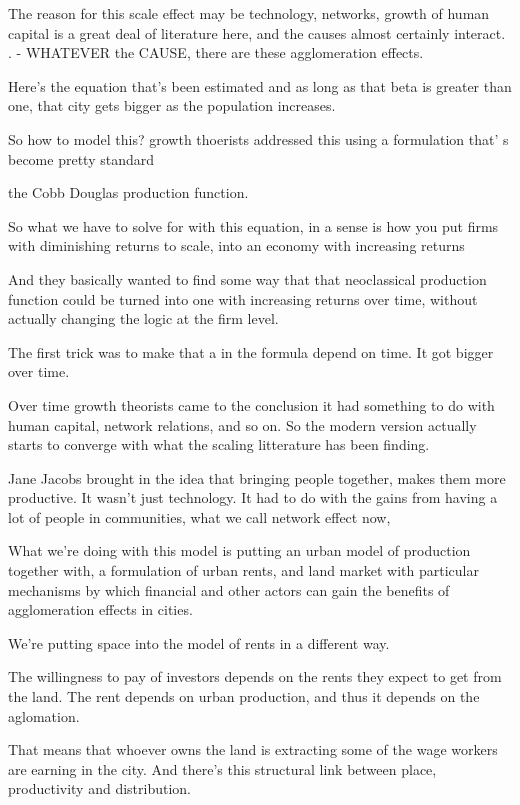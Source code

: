 \documentclass[]{article}
\begin{document}
The reason for this scale effect may be technology, networks, growth of human capital is a great deal of literature here, and the causes almost certainly interact. . - WHATEVER the CAUSE, there are these agglomeration effects. 

Here's the equation that's been estimated and as long as that beta is greater than one, that city gets bigger as the population increases.

So how to model this?
growth thoerists addressed this using a formulation that' s become pretty standard

the Cobb Douglas production function.  

So what we have to solve for with this equation, in a sense is how you put firms with diminishing returns to scale, into an economy with increasing returns

And they basically wanted to find some way that that neoclassical production function could be turned into one with increasing returns over time, without actually changing the logic at the firm level.

The first trick was to make that a in the formula depend on time. It got bigger over time.

Over time  growth theorists came to the conclusion it had something to do with human capital, network relations, and so on. So the modern version actually starts to converge with what the scaling litterature has been finding. 

Jane Jacobs brought in the idea that bringing people together, makes them more productive. It wasn't just technology. It had to do with the gains from having a lot of people in communities,  what we call  network effect now,


What we're doing with this model is putting an urban model of production together with, a formulation of urban rents, and land market with particular mechanisms by which financial and other actors can gain the benefits of agglomeration effects in cities. 

We're putting space into the model of rents in a different way. 

The willingness to pay of investors depends on the rents they expect to get from the land.
 The rent depends on urban production, and thus it depends on the aglomation. 
 
That means that whoever owns the land is extracting some of the wage workers are earning in the city.
And there's this structural link between place, productivity and distribution. 
\end{document}
